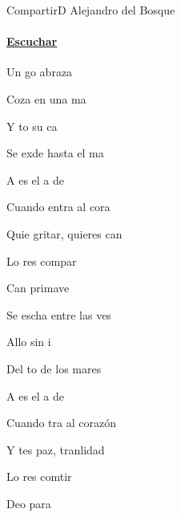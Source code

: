 \documentclass[12pt, spanish]{book}
\begin{document}
    \begin{song}{Compartir}{D}
        {} %
        {Alejandro del Bosque}
        {} %
        {}
        \ifChordBk
        \paragraph{\mbox{}\hfill\protect\href{https://open.spotify.com/intl-es/track/0DAW1RygjMUFCG7sMPcn7c}{Escuchar}\mbox{}\hfill}
        \fi


        \begin{SBOpGroup}
            Un go abraza

            Coza en una ma

            Y to su ca

            Se exde hasta el ma
        \end{SBOpGroup}

        \begin{SBChorus}
            A es el a de 

            Cuando entra al cora

            Quie gritar, quieres can

            Lo res compar
        \end{SBChorus}

        \begin{SBOpGroup}
            Can primave

            Se escha entre las ves

            Allo sin i

            Del to de los mares

            A  es el a de  

            Cuando tra al corazón

            Y  tes paz, tranlidad

            Lo  res comtir
        \end{SBOpGroup}

        \begin{SBOpGroup}
            Deo para 


\end{SBOpGroup}
\end{song}
\end{document}
